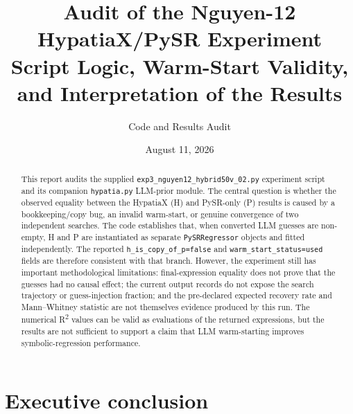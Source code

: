 \documentclass[11pt]{article}
\title{Audit of the Nguyen-12 HypatiaX/PySR Experiment\\
\large Script Logic, Warm-Start Validity, and Interpretation of the Results}
\author{Code and Results Audit}
\date{August 11, 2026}
\begin{document}
\maketitle

\begin{abstract}
This report audits the supplied \texttt{exp3\_nguyen12\_hybrid50v\_02.py} experiment script and its companion \texttt{hypatia.py} LLM-prior module. The central question is whether the observed equality between the HypatiaX (H) and PySR-only (P) results is caused by a bookkeeping/copy bug, an invalid warm-start, or genuine convergence of two independent searches. The code establishes that, when converted LLM guesses are non-empty, H and P are instantiated as separate \texttt{PySRRegressor} objects and fitted independently. The reported \texttt{h\_is\_copy\_of\_p=false} and \texttt{warm\_start\_status=used} fields are therefore consistent with that branch. However, the experiment still has important methodological limitations: final-expression equality does not prove that the guesses had no causal effect; the current output records do not expose the search trajectory or guess-injection fraction; and the pre-declared expected recovery rate and Mann--Whitney statistic are not themselves evidence produced by this run. The numerical R\textsuperscript{2} values can be valid as evaluations of the returned expressions, but the results are not sufficient to support a claim that LLM warm-starting improves symbolic-regression performance.
\end{abstract}

\section{Executive conclusion}
\end{document}
